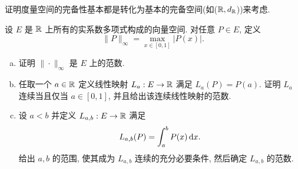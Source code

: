 \begin{remark}
证明度量空间的完备性基本都是转化为基本的完备空间(如($\mathbb{R},d_{\mathbb{R}}$))来考虑.
\end{remark}


\begin{exercise}
     设 $E$ 是 $\mathbb{R}$ 上所有的实系数多项式构成的向量空间. 对任意 $P\in E$, 定义
    \[\|P\|_{\infty}=\max_{x\in[0,1]}|P(x)|.\]
    \begin{enumerate}[(a)]
    \item 证明 $\|\cdot\|_{\infty}$ 是 $E$ 上的范数.
    \item 任取一个 $a\in\mathbb{R}$ 定义线性映射 $L_a:E\to\mathbb{R}$ 满足 $L_a(P)=P(a)$. 证明 $L_a$ 连续当且仅当 $a\in[0,1]$, 并且给出该连续线性映射的范数.
    \item 设 $a<b$ 并定义 $L_{a,b}:E\to\mathbb{R}$ 满足
    \[L_{a,b}(P)=\int_a^bP(x)\mathop{}\!\mathrm{d} x.\]
    给出 $a,b$ 的范围, 使其成为 $L_{a,b}$ 连续的充分必要条件, 然后确定 $L_{a,b}$ 的范数.
    \end{enumerate}
\end{exercise}

